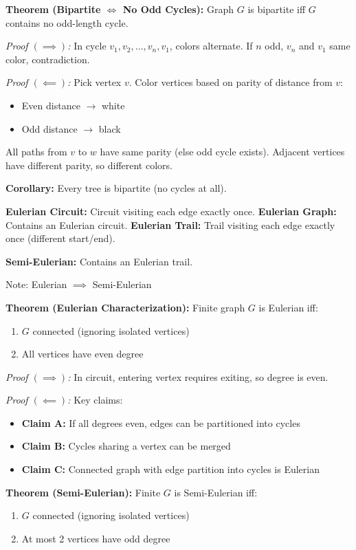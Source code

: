 \documentclass[10pt,landscape]{article}
\begin{document}
\begin{multicols}{3}
\textbf{Theorem (Bipartite $\iff$ No Odd Cycles):} Graph $G$ is bipartite iff $G$ contains no odd-length cycle.

\textit{Proof $(\implies)$:} In cycle $v_1, v_2, \ldots, v_n, v_1$, colors alternate. If $n$ odd, $v_n$ and $v_1$ same color, contradiction.

\textit{Proof $(\impliedby)$:} Pick vertex $v$. Color vertices based on parity of distance from $v$:
\begin{itemize}
    \item Even distance $\to$ white
    \item Odd distance $\to$ black
\end{itemize}
All paths from $v$ to $w$ have same parity (else odd cycle exists). Adjacent vertices have different parity, so different colors.

\textbf{Corollary:} Every tree is bipartite (no cycles at all).

\textbf{Eulerian Circuit:} Circuit visiting each edge exactly once.
\textbf{Eulerian Graph:} Contains an Eulerian circuit.
\textbf{Eulerian Trail:} Trail visiting each edge exactly once (different start/end).

\textbf{Semi-Eulerian:} Contains an Eulerian trail.

Note: Eulerian $\implies$ Semi-Eulerian

\textbf{Theorem (Eulerian Characterization):} Finite graph $G$ is Eulerian iff:
\begin{enumerate}
    \item $G$ connected (ignoring isolated vertices)
    \item All vertices have even degree
\end{enumerate}

\textit{Proof $(\implies)$:} In circuit, entering vertex requires exiting, so degree is even.

\textit{Proof $(\impliedby)$:} Key claims:
\begin{itemize}
    \item \textbf{Claim A:} If all degrees even, edges can be partitioned into cycles
    \item \textbf{Claim B:} Cycles sharing a vertex can be merged
    \item \textbf{Claim C:} Connected graph with edge partition into cycles is Eulerian
\end{itemize}

\textbf{Theorem (Semi-Eulerian):} Finite $G$ is Semi-Eulerian iff:
\begin{enumerate}
    \item $G$ connected (ignoring isolated vertices)
    \item At most 2 vertices have odd degree
\end{enumerate}


\end{multicols}
\end{document}
